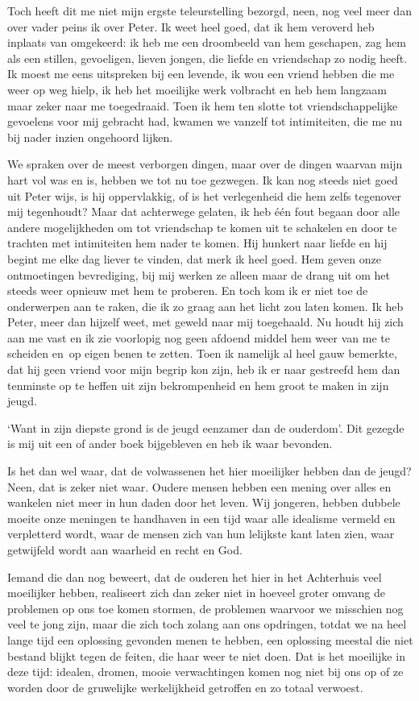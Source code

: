 \documentclass{book}
\begin{document}
Toch heeft dit me niet mijn ergste teleurstelling bezorgd, neen, nog veel meer
dan over vader peins ik over Peter. Ik weet heel goed, dat ik hem veroverd heb
inplaats van omgekeerd: ik heb me een droombeeld van hem geschapen, zag hem als
een stillen, gevoeligen, lieven jongen, die liefde en vriendschap zo nodig
heeft. Ik moest me eens uitspreken bij een levende, ik wou een vriend hebben die
me weer op weg hielp, ik heb het moeilijke werk volbracht en heb hem langzaam
maar zeker naar me toegedraaid. Toen ik hem ten slotte tot vriendschappelijke
gevoelens voor mij gebracht had, kwamen we vanzelf tot intimiteiten, die me nu
bij nader inzien ongehoord lijken.

We spraken over de meest verborgen dingen, maar over de dingen waarvan mijn hart
vol was en is, hebben we tot nu toe gezwegen. Ik kan nog steeds niet goed uit
Peter wijs, is hij oppervlakkig, of is het verlegenheid die hem zelfs tegenover
mij tegenhoudt? Maar dat achterwege gelaten, ik heb één fout begaan door alle
andere mogelijkheden om tot vriendschap te komen uit te schakelen en door te
trachten met intimiteiten hem nader te komen. Hij hunkert naar liefde en hij
begint me elke dag liever te vinden, dat merk ik heel goed. Hem geven onze
ontmoetingen bevrediging, bij mij werken ze alleen maar de drang uit om het
steeds weer opnieuw met hem te proberen. En toch kom ik er niet toe de
onderwerpen aan te raken, die ik zo graag aan het licht zou laten komen. Ik heb
Peter, meer dan hijzelf weet, met geweld naar mij toegehaald. Nu houdt hij zich
aan me vast en ik zie voorlopig nog geen afdoend middel hem weer van me te
scheiden en~op eigen benen te zetten.  Toen ik namelijk al heel gauw bemerkte,
dat hij geen vriend voor mijn begrip kon zijn, heb ik er naar gestreefd hem dan
tenminste op te heffen uit zijn bekrompenheid en hem groot te maken in zijn
jeugd.

`Want in zijn diepste grond is de jeugd eenzamer dan de ouderdom'. Dit gezegde
is mij uit een of ander boek bijgebleven en heb ik waar bevonden.

Is het dan wel waar, dat de volwassenen het hier moeilijker hebben dan de jeugd?
Neen, dat is zeker niet waar. Oudere mensen hebben een mening over alles en
wankelen niet meer in hun daden door het leven. Wij jongeren, hebben dubbele
moeite onze meningen te handhaven in een tijd waar alle idealisme vermeld en
verpletterd wordt, waar de mensen zich van hun lelijkste kant laten zien, waar
getwijfeld wordt aan waarheid en recht en God.

Iemand die dan nog beweert, dat de ouderen het hier in het Achterhuis veel
moeilijker hebben, realiseert zich dan zeker niet in hoeveel groter omvang de
problemen op ons toe komen stormen, de problemen waarvoor we misschien nog veel
te jong zijn, maar die zich toch zolang aan ons opdringen, totdat we na heel
lange tijd een oplossing gevonden menen te hebben, een oplossing meestal die
niet bestand blijkt tegen de feiten, die haar weer te niet doen. Dat is het
moeilijke in deze tijd: idealen, dromen, mooie verwachtingen komen nog niet bij
ons op of ze worden door de gruwelijke werkelijkheid getroffen en zo totaal
verwoest.
\end{document}
